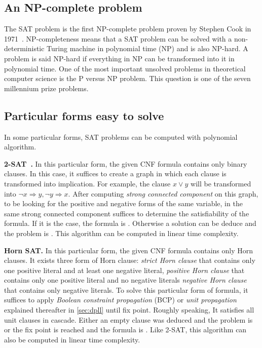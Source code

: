 \subsection{An NP-complete problem}
The SAT problem is the first NP-complete problem proven by Stephen Cook in 1971~\cite{cook1971complexity}.
NP-completeness means that a SAT problem can be solved with a non-deterministic Turing machine in polynomial time (NP) and is also NP-hard. A problem is said NP-hard if everything in NP can be transformed into it in polynomial time. 
One of the most important unsolved problems in theoretical computer science is the P versus NP problem.
This question is one of the seven millennium prize problems.


\subsection{Particular forms easy to solve}
In some particular forms, SAT problems can be computed with polynomial algorithm.


\textbf{2-SAT~\cite{aspvall1979linear}.}
In this particular form, the given CNF formula contains only binary clauses.
In this case, it suffices to create a graph in which each clause is transformed into implication. For example, the clause $x \lor y$ will be transformed into $ \neg x \Rightarrow y,
\neg y \Rightarrow x$. After computing \emph{strong connected component} on this graph, to be looking for
 the positive and negative forms of the same variable, in the same  strong connected component suffices 
to determine the satisfiability of the formula. If it is the case, the formula is \unsat. Otherwise 
a solution can be deduce and the problem is \sat. This algorithm can be computed in linear time complexity.

\textbf{Horn SAT.} In this particular form, the given CNF formula contains only Horn clauses. It exists three form
of Horn clause: \emph{strict Horn clause} that contains only one positive literal and at least one negative literal,
\emph{positive Horn clause} that contains only one positive literal and no negative literals
\emph{negative Horn clause} that contains only negative literals.
To solve this particular form of formula, it suffices to  apply \emph{Boolean constraint propagation} (BCP) or \emph{unit propagation} explained thereafter in \cref{sec:dpll} until fix point.
Roughly speaking, It satisfies all unit clauses in cascade. Either an empty clause was deduced and the problem
is \unsat or the fix point is reached and the formula is \sat. Like 2-SAT, this algorithm can also be computed
in linear time complexity.



